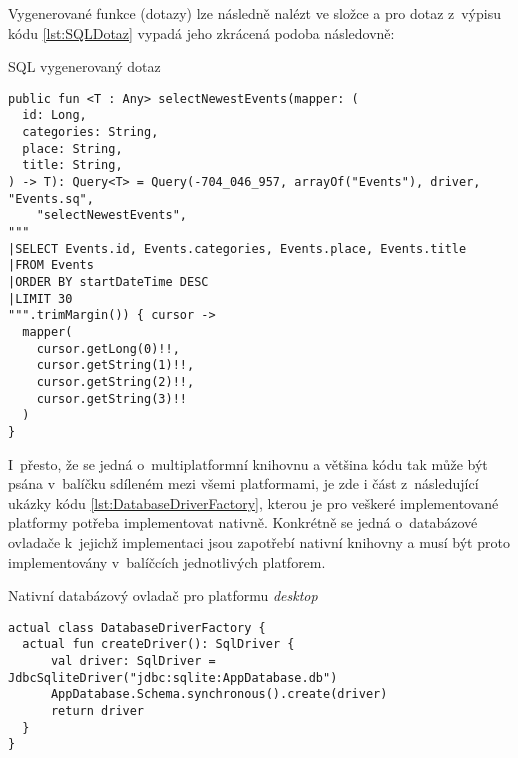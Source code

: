 Vygenerované funkce (dotazy) lze následně nalézt ve složce  a pro dotaz z~výpisu kódu \ref{lst:SQLDotaz}
vypadá jeho zkrácená podoba následovně:

\begin{listing}[H]
\caption{SQL vygenerovaný dotaz}\label{lst:SQLGeneratedDotaz}
\begin{verbatim}
public fun <T : Any> selectNewestEvents(mapper: (
  id: Long,
  categories: String,
  place: String,
  title: String,
) -> T): Query<T> = Query(-704_046_957, arrayOf("Events"), driver, "Events.sq",
    "selectNewestEvents", 
"""
|SELECT Events.id, Events.categories, Events.place, Events.title
|FROM Events
|ORDER BY startDateTime DESC
|LIMIT 30
""".trimMargin()) { cursor ->
  mapper(
    cursor.getLong(0)!!,
    cursor.getString(1)!!,
    cursor.getString(2)!!,
    cursor.getString(3)!!
  )
}
\end{verbatim}
\end{listing}

I~přesto, že se jedná o~multiplatformní knihovnu a většina kódu tak může být psána v~balíčku sdíleném mezi všemi platformami, je zde i 
část z~následující ukázky kódu \ref{lst:DatabaseDriverFactory}, kterou je pro veškeré implementované platformy potřeba implementovat
nativně. Konkrétně se jedná o~databázové ovladače k~jejichž implementaci jsou 
zapotřebí nativní knihovny a musí být proto implementovány v~balíčcích jednotlivých platforem.

\begin{listing}[H]
\caption{Nativní databázový ovladač pro platformu \textit{desktop}}\label{lst:DatabaseDriverFactory}
\begin{verbatim}
actual class DatabaseDriverFactory {
  actual fun createDriver(): SqlDriver {
      val driver: SqlDriver = JdbcSqliteDriver("jdbc:sqlite:AppDatabase.db")
      AppDatabase.Schema.synchronous().create(driver)
      return driver
  }
}
\end{verbatim}
\end{listing}






